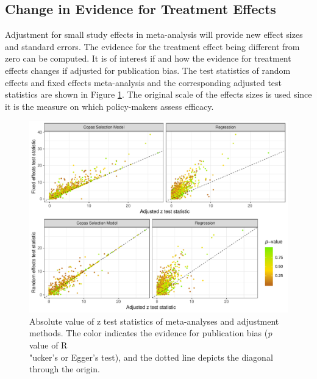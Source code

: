 \documentclass[11pt,a4paper,twoside]{book}\usepackage[]{graphicx}\usepackage[]{color}
\newenvironment{knitrout}{}{} %
\begin{document}
\subsection{Change in Evidence for Treatment Effects} \label{sec:change.evidence}
Adjustment for small study effects in meta-analysis will provide new effect sizes and standard errors. The evidence for the treatment effect being different from zero can be computed. It is of interest if and how the evidence for treatment effects changes if adjusted for publication bias. The test statistics of random effects and fixed effects meta-analysis and the corresponding adjusted test statistics are shown in Figure \ref{fig:evidence.adjustment}. The original scale of the effects sizes is used since it is the measure on which policy-makers assess efficacy.

\begin{figure}
\begin{knitrout}
\color{fgcolor}

{\centering \includegraphics[width=\textwidth-3cm]{figure/ch03_figunnamed-chunk-25-1} 

}



\end{knitrout}
\caption{Absolute value of z test statistics of meta-analyses and adjustment methods. The color indicates the evidence for publication bias (\textit{p} value of R\\"ucker's or Egger's test), and the dotted line depicts the diagonal through the origin.}
\label{fig:evidence.adjustment}
\end{figure}
\end{document}
